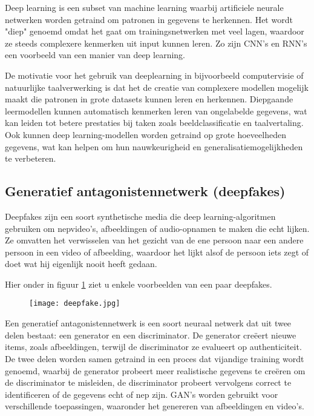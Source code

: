 Deep learning is een subset van machine learning waarbij artificiele neurale netwerken worden getraind om patronen in gegevens te herkennen. Het wordt "diep" genoemd omdat het gaat om trainingsnetwerken met veel lagen, waardoor ze steeds complexere kenmerken uit input kunnen leren. Zo zijn CNN's en RNN's een voorbeeld van een manier van deep learning.

De motivatie voor het gebruik van deeplearning in bijvoorbeeld computervisie of natuurlijke taalverwerking is dat het de creatie van complexere modellen mogelijk maakt die patronen in grote datasets kunnen leren en herkennen. Diepgaande leermodellen kunnen automatisch kenmerken leren van ongelabelde gegevens, wat kan leiden tot betere prestaties bij taken zoals beeldclassificatie en taalvertaling. Ook kunnen deep learning-modellen worden getraind op grote hoeveelheden gegevens, wat kan helpen om hun nauwkeurigheid en generalisatiemogelijkheden te verbeteren.

\cite{yan2015deep}

\subsection{Generatief antagonistennetwerk (deepfakes)}

Deepfakes zijn een soort synthetische media die deep learning-algoritmen gebruiken om nepvideo's, afbeeldingen of audio-opnamen te maken die echt lijken. Ze omvatten het verwisselen van het gezicht van de ene persoon naar een andere persoon in een video of afbeelding, waardoor het lijkt alsof de persoon iets zegt of doet wat hij eigenlijk nooit heeft gedaan. 

Hier onder in figuur \ref{fig:deepfake_example} ziet u enkele voorbeelden van een paar deepfakes.

\begin{figure}[htbp]
    \centering
    \texttt{[image: deepfake.jpg]}
    \caption{\cite{Walsh2021}}
    \label{fig:deepfake_example}
\end{figure}

\cite{mahmud2021deep}

Een generatief antagonistennetwerk is een soort neuraal netwerk dat uit twee delen bestaat: een generator en een discriminator. De generator creëert nieuwe items, zoals afbeeldingen, terwijl de discriminator ze evalueert op authenticiteit. De twee delen worden samen getraind in een proces dat vijandige training wordt genoemd, waarbij de generator probeert meer realistische gegevens te creëren om de discriminator te misleiden, de discriminator probeert vervolgens correct te identificeren of de gegevens echt of nep zijn. GAN's worden gebruikt voor verschillende toepassingen, waaronder het genereren van afbeeldingen en video's.

